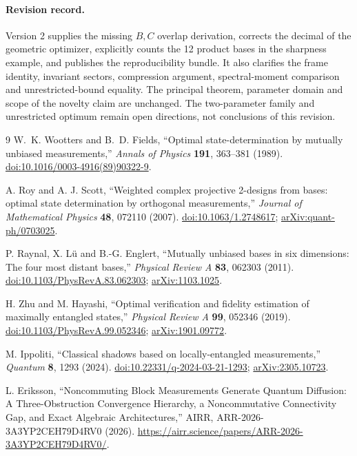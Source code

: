 \documentclass[11pt,a4paper]{article}
\theoremstyle{remark}
\begin{document}
\paragraph{Revision record.}
Version 2 supplies the missing $B,C$ overlap derivation, corrects the decimal of the geometric optimizer, explicitly counts the 12 product bases in the sharpness example, and publishes the reproducibility bundle. It also clarifies the frame identity, invariant sectors, compression argument, spectral-moment comparison and unrestricted-bound equality. The principal theorem, parameter domain and scope of the novelty claim are unchanged. The two-parameter family and unrestricted optimum remain open directions, not conclusions of this revision.

\begin{thebibliography}{9}
W.~K. Wootters and B.~D. Fields,
``Optimal state-determination by mutually unbiased measurements,''
\emph{Annals of Physics} \textbf{191}, 363--381 (1989).
\href{https://doi.org/10.1016/0003-4916(89)90322-9}{doi:10.1016/0003-4916(89)90322-9}.

A. Roy and A. J. Scott,
``Weighted complex projective 2-designs from bases: optimal state determination by orthogonal measurements,''
\emph{Journal of Mathematical Physics} \textbf{48}, 072110 (2007).
\href{https://doi.org/10.1063/1.2748617}{doi:10.1063/1.2748617};
\href{https://arxiv.org/abs/quant-ph/0703025}{arXiv:quant-ph/0703025}.

P. Raynal, X. L\"u and B.-G. Englert,
``Mutually unbiased bases in six dimensions: The four most distant bases,''
\emph{Physical Review A} \textbf{83}, 062303 (2011).
\href{https://doi.org/10.1103/PhysRevA.83.062303}{doi:10.1103/PhysRevA.83.062303};
\href{https://arxiv.org/abs/1103.1025}{arXiv:1103.1025}.

H. Zhu and M. Hayashi,
``Optimal verification and fidelity estimation of maximally entangled states,''
\emph{Physical Review A} \textbf{99}, 052346 (2019).
\href{https://doi.org/10.1103/PhysRevA.99.052346}{doi:10.1103/PhysRevA.99.052346};
\href{https://arxiv.org/abs/1901.09772}{arXiv:1901.09772}.

M. Ippoliti,
``Classical shadows based on locally-entangled measurements,''
\emph{Quantum} \textbf{8}, 1293 (2024).
\href{https://doi.org/10.22331/q-2024-03-21-1293}{doi:10.22331/q-2024-03-21-1293};
\href{https://arxiv.org/abs/2305.10723}{arXiv:2305.10723}.

L. Eriksson,
``Noncommuting Block Measurements Generate Quantum Diffusion:
A Three-Obstruction Convergence Hierarchy, a Noncommutative Connectivity Gap, and Exact Algebraic Architectures,''
AIRR, ARR-2026-3A3YP2CEH79D4RV0 (2026).
\url{https://airr.science/papers/ARR-2026-3A3YP2CEH79D4RV0/}.
\end{thebibliography}
\end{document}
